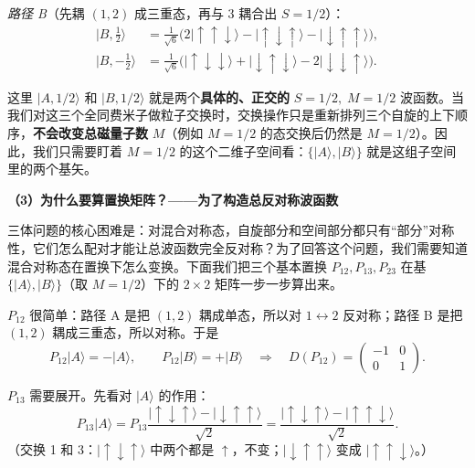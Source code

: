 \textit{路径 B}（先耦 $(1,2)$ 成三重态，再与 3 耦合出 $S=1/2$）：
\begin{align}
|B,\tfrac{1}{2}\rangle &= \frac{1}{\sqrt{6}}\bigl(2|\uparrow\uparrow\downarrow\rangle - |\uparrow\downarrow\uparrow\rangle - |\downarrow\uparrow\uparrow\rangle\bigr), \\
|B,-\tfrac{1}{2}\rangle &= \frac{1}{\sqrt{6}}\bigl(|\uparrow\downarrow\downarrow\rangle + |\downarrow\uparrow\downarrow\rangle - 2|\downarrow\downarrow\uparrow\rangle\bigr).
\end{align}

这里 $|A,1/2\rangle$ 和 $|B,1/2\rangle$ 就是两个\textbf{具体的、正交的} $S=1/2,\;M=1/2$ 波函数。当我们对这三个全同费米子做粒子交换时，交换操作只是重新排列三个自旋的上下顺序，\textbf{不会改变总磁量子数} $M$（例如 $M=1/2$ 的态交换后仍然是 $M=1/2$）。因此，我们只需要盯着 $M=1/2$ 的这个二维子空间看：$\{|A\rangle,|B\rangle\}$ 就是这组子空间里的两个基矢。

\textbf{（3）为什么要算置换矩阵？——为了构造总反对称波函数}

三体问题的核心困难是：对混合对称态，自旋部分和空间部分都只有``部分''对称性，它们怎么配对才能让总波函数完全反对称？为了回答这个问题，我们需要知道混合对称态在置换下怎么变换。下面我们把三个基本置换 $P_{12},P_{13},P_{23}$ 在基 $\{|A\rangle,|B\rangle\}$（取 $M=1/2$）下的 $2\times 2$ 矩阵一步一步算出来。

\textit{$P_{12}$} 很简单：路径 A 是把 $(1,2)$ 耦成单态，所以对 $1\leftrightarrow 2$ 反对称；路径 B 是把 $(1,2)$ 耦成三重态，所以对称。于是
\[
P_{12}|A\rangle=-|A\rangle,\qquad P_{12}|B\rangle=+|B\rangle
\quad\Longrightarrow\quad
D(P_{12})=\begin{pmatrix}-1&0\\0&1\end{pmatrix}.
\]

\textit{$P_{13}$} 需要展开。先看对 $|A\rangle$ 的作用：
\[
P_{13}|A\rangle=P_{13}\frac{|\uparrow\downarrow\uparrow\rangle-|\downarrow\uparrow\uparrow\rangle}{\sqrt{2}}
=\frac{|\uparrow\downarrow\uparrow\rangle-|\uparrow\uparrow\downarrow\rangle}{\sqrt{2}}.
\]
（交换 1 和 3：$|\uparrow\downarrow\uparrow\rangle$ 中两个都是 $\uparrow$，不变；$|\downarrow\uparrow\uparrow\rangle$ 变成 $|\uparrow\uparrow\downarrow\rangle$。）

